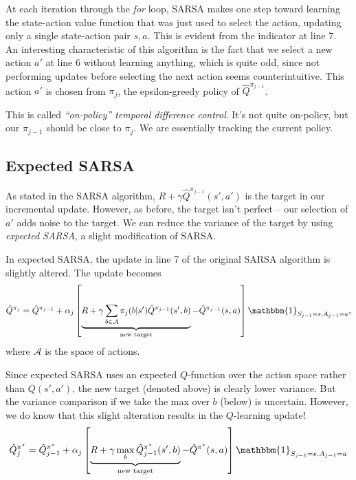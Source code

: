 \documentclass[11pt]{article}
\begin{document}
At each iteration through the \textit{for} loop, SARSA makes one step toward learning the state-action value function that was just used to select the action, updating only a single state-action pair $s, a$. This is evident from the indicator at line 7. An interesting characteristic of this algorithm is the fact that we select a new action $a'$ at line 6 without learning anything, which is quite odd, since not performing updates before selecting the next action seems counterintuitive. This action $a'$ is chosen from $\pi_j$, the epsilon-greedy policy of $\hat{Q}^{\pi_{j-1}}$.

This is called \textit{``on-policy'' temporal difference control}. It's not quite on-policy, but our $\pi_{j-1}$ should be close to $\pi_j$. We are essentially tracking the current policy.

\subsection{Expected SARSA}

As stated in the SARSA algorithm, $R + \gamma \hat{Q}^{\pi_{j-1}}(s', a')$ is the target in our incremental update. However, as before, the target isn't perfect -- our selection of $a'$ adds noise to the target. We can reduce the variance of the target by using \textit{expected SARSA}, a slight modification of SARSA.

In expected SARSA, the update in line 7 of the original SARSA algorithm is slightly altered. The update becomes $$\hat{Q}^{\pi_{j}} = \hat{Q}^{\pi_{j - 1}} + \alpha_j\left[\underbrace{R + \gamma \sum_{b \in \mathcal{A}}\pi_j(b|s')\hat{Q}^{\pi_{j - 1}}(s', b)}_\text{new target} - \hat{Q}^{\pi_{j - 1}}(s, a)\right]\mathbbm{1}_{S_{j-1}=s, A_{j-1}=a},$$ where $\mathcal{A}$ is the space of actions. 

Since expected SARSA uses an expected $Q$-function over the action space rather than $Q(s',a')$, the new target (denoted above) is clearly lower variance. But the variance comparison if we take the max over $b$ (below) is uncertain. However, we do know that this slight alteration results in the $Q$-learning update!
$$\hat{Q}_j^{\pi^\star} = \hat{Q}_{j - 1}^{\pi^\star} + \alpha_j\left[\underbrace{R + \gamma \max_{b} \hat{Q}_{j - 1}^{\pi^\star}(s', b)}_\text{new target} - \hat{Q}^{\pi^\star}(s, a)\right]\mathbbm{1}_{S_{j-1}=s, A_{j-1}=a}$$






\end{document}
